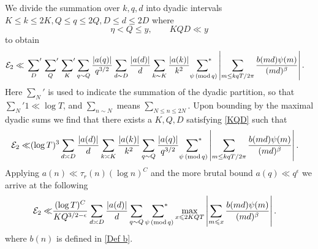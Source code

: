 \documentclass[oneside, 12pt]{amsart}
\theoremstyle{definition}
\renewcommand{\pmod}[1]{\,(\textup{mod}\,#1)}
\newcommand{\leqs}{\leqslant }
\begin{document}
	We divide the summation over $k, q,d$ into dyadic intervals 
	$K\leqs k \leqs 2K, Q\leqs q\leqs 2Q, D\leqs d\leqs 2D$ where 
	\begin{equation}
	\label{KQD}
	\eta< Q\leqs y, \qquad KQD\ll y
	\end{equation} 
	to obtain
 \begin{align*}
	\mathcal{E}_2&\ll \sideset{}{'}\sum_{D}\sideset{}{'}\sum_{Q}\sideset{}{'}\sum_{K}
	\sum_{\substack{q\sim Q}} \frac{|a(q)|}{q^{3/2}}
	\sum_{\substack{d\sim D}}\frac{|a(d)|}{d}
	\sum_{\substack{k\sim K} } \frac{|a(k)|}{k^2}
	\sideset{}{^*}\sum_{\,\,\psi \pmod q} \left|\sum_{m\leq kqT/2\pi}\frac{b(md)\psi(m)}{(md)^\beta}\right|.
	\end{align*}
	Here $\sum_{N}'$ is used to indicate the summation of the dyadic partition, so that $\sum_{N}' 1 \ll \log T$, and $\sum_{n\sim N}$ means $\sum_{N\leqs n\leqs 2N}$. 
	Upon bounding by the maximal dyadic sums we find that there exists a $K,Q, D$ satisfying \eqref{KQD} such that 
	 \begin{align*}
	\mathcal{E}_2\ll & (\log T)^3
	\sum_{\substack{d\asymp D}}\frac{|a(d)|}{d}
	\sum_{\substack{k\asymp K} } \frac{|a(k)|}{k^2}
	\sum_{\substack{q\sim Q}} \frac{|a(q)|}{q^{3/2}}
	\sideset{}{^*}\sum_{\,\,\psi \pmod q} \left|\sum_{m\leq kqT/2\pi}\frac{b(md)\psi(m)}{(md)^\beta}\right|.
	\end{align*}
	Applying $a(n)\ll \tau_r(n)(\log n)^C$ and the more brutal bound $a(q)\ll q^{\epsilon}$ we arrive at the following	
 \begin{align}
 \label{E_2 initial bound}
	\mathcal{E}_2\ll
	&  \frac{(\log T)^C}{KQ^{3/2-\epsilon}} 	
	\sum_{\substack{d\asymp D}}\frac{|a(d)|}{d}
	\sum_{\substack{q\sim Q}} 
	\sideset{}{^*}\sum_{\,\,\psi \pmod q} \max_{x\leqs 2KQT}\left|\sum_{m\leqs x }\frac{b(md)\psi(m)}{(md)^\beta}\right|.
	\end{align}
where $b(n)$ is defined in \eqref{Def b}.
%
\end{document}
